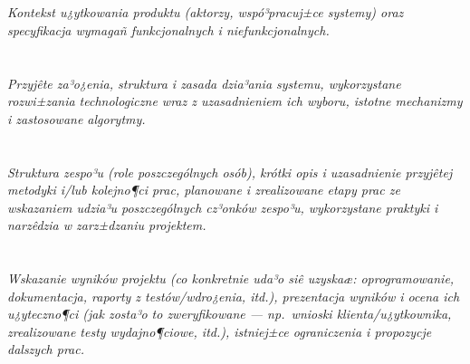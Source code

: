 \documentclass[english,12pt]{aghthesis}
\begin{document}
\section{\SectionTitleScope}
\label{sec:zakres-funkcjonalnosci}
\emph{Kontekst u¿ytkowania produktu (aktorzy, wspó³pracuj±ce systemy)
  oraz specyfikacja wymagañ funkcjonalnych i niefunkcjonalnych.}  

\section{\SectionTitleRealizationAspects}
\label{sec:wybrane-aspekty-realizacji}
\emph{Przyjête za³o¿enia, struktura i zasada dzia³ania systemu,
  wykorzystane rozwi±zania technologiczne wraz z uzasadnieniem
  ich wyboru, istotne mechanizmy i zastosowane algorytmy.} 

\section{\SectionTitleWorkOrganization}
\label{sec:organizacja-pracy}
\emph{Struktura zespo³u (role poszczególnych osób), krótki opis i
  uzasadnienie przyjêtej metodyki i/lub kolejno¶ci prac, planowane i
  zrealizowane etapy prac ze wskazaniem udzia³u poszczególnych
  cz³onków zespo³u, wykorzystane praktyki i narzêdzia w zarz±dzaniu
  projektem.}  

\section{\SectionTitleResults}
\label{sec:wyniki-projektu}
\emph{Wskazanie wyników projektu (co konkretnie uda³o siê uzyskaæ:
  oprogramowanie, dokumentacja, raporty z testów/wdro¿enia, itd.), prezentacja wyników
  i ocena ich u¿yteczno¶ci (jak zosta³o to zweryfikowane --- np.\ wnioski
  klienta/u¿ytkownika, zrealizowane testy wydajno¶ciowe, itd.),
  istniej±ce ograniczenia i propozycje dalszych prac.} 

\end{document}
